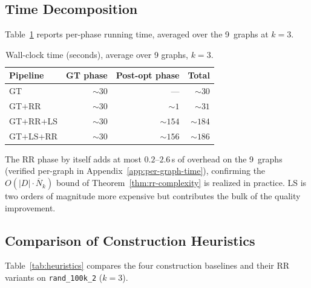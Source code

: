 \documentclass[11pt,a4paper]{article}
\newcommand{\Nk}{\overline{N}_k}
\begin{document}
\subsection{Time Decomposition}
\label{sec:exp:time}

Table~\ref{tab:time} reports per-phase running time, averaged over the
9~graphs at $k=3$.

\begin{table}[ht]
\centering
\caption{Wall-clock time (seconds), average over 9 graphs, $k=3$.}
\label{tab:time}
\begin{tabular}{lrrr}
\toprule
\textbf{Pipeline} & \textbf{GT phase} & \textbf{Post-opt phase} & \textbf{Total}\\
\midrule
GT             & ${\sim}30$ & ---           & ${\sim}30$ \\
GT$+$RR        & ${\sim}30$ & ${\sim}1$     & ${\sim}31$ \\
GT$+$RR$+$LS   & ${\sim}30$ & ${\sim}154$   & ${\sim}184$ \\
GT$+$LS$+$RR   & ${\sim}30$ & ${\sim}156$   & ${\sim}186$ \\
\bottomrule
\end{tabular}
\end{table}

The RR phase by itself adds at most $0.2$--$2.6$\,s of overhead on the
9~graphs (verified per-graph in
Appendix~\ref{app:per-graph-time}), confirming the $O(|D|\cdot\Nk)$
bound of Theorem~\ref{thm:rr-complexity} is realized in practice. LS is
two orders of magnitude more expensive but contributes the bulk of the
quality improvement.


\subsection{Comparison of Construction Heuristics}
\label{sec:exp:heuristics}

Table~\ref{tab:heuristics} compares the four construction baselines and
their RR variants on \texttt{rand\_100k\_2} ($k=3$).
\end{document}

